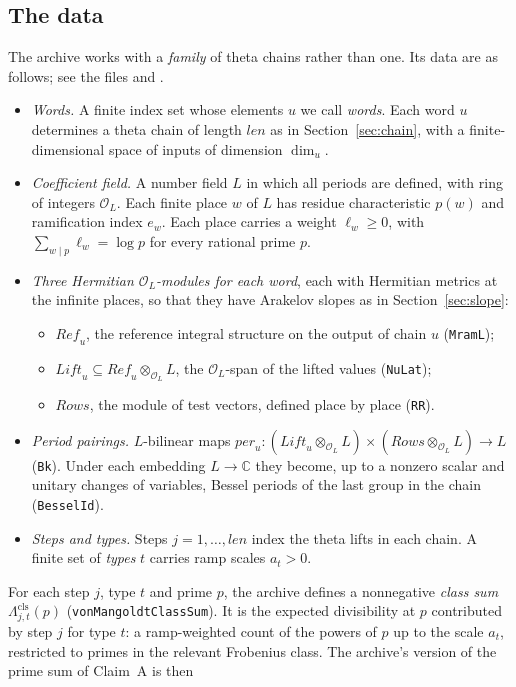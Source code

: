 \documentclass[11pt]{amsart}
\theoremstyle{definition}
\theoremstyle{remark}
\newcommand{\per}{\mathit{per}}
\newcommand{\len}{\mathit{len}}
\newcommand{\C}{\mathbb{C}}
\begin{document}
\subsection{The data}\label{subsec:assembly-data}
The archive works with a \emph{family} of theta chains rather than one. Its data are as follows; see the files  and .

\begin{itemize}
\item \emph{Words.} A finite index set whose elements $u$ we call \emph{words}. Each word $u$ determines a theta chain of length $\len$ as in Section~\ref{sec:chain}, with a finite-dimensional space of inputs of dimension $\dim_u$.
\item \emph{Coefficient field.} A number field $L$ in which all periods are defined, with ring of integers $\mathcal O_L$. Each finite place $w$ of $L$ has residue characteristic $p(w)$ and ramification index $e_w$. Each place carries a weight $\ell_w\ge0$, with $\sum_{w\mid p}\ell_w=\log p$ for every rational prime $p$.
\item \emph{Three Hermitian $\mathcal O_L$-modules for each word}, each with Hermitian metrics at the infinite places, so that they have Arakelov slopes as in Section~\ref{sec:slope}:
\begin{itemize}
\item $\mathit{Ref}_u$, the reference integral structure on the output of chain $u$ (\texttt{MramL});
\item $\mathit{Lift}_u\subseteq\mathit{Ref}_u\otimes_{\mathcal O_L}L$, the $\mathcal O_L$-span of the lifted values (\texttt{NuLat});
\item $\mathit{Rows}$, the module of test vectors, defined place by place (\texttt{RR}).
\end{itemize}
\item \emph{Period pairings.} $L$-bilinear maps $\per_u\colon(\mathit{Lift}_u\otimes_{\mathcal O_L}L)\times(\mathit{Rows}\otimes_{\mathcal O_L}L)\to L$ (\texttt{Bk}). Under each embedding $L\to\C$ they become, up to a nonzero scalar and unitary changes of variables, Bessel periods of the last group in the chain (\texttt{BesselId}).
\item \emph{Steps and types.} Steps $j=1,\dots,\len$ index the theta lifts in each chain. A finite set of \emph{types} $t$ carries ramp scales $a_t>0$.
\end{itemize}
For each step $j$, type $t$ and prime $p$, the archive defines a nonnegative \emph{class sum} $\Lambda^{\mathrm{cls}}_{j,t}(p)$ (\texttt{vonMangoldtClassSum}). It is the expected divisibility at $p$ contributed by step $j$ for type $t$: a ramp-weighted count of the powers of $p$ up to the scale $a_t$, restricted to primes in the relevant Frobenius class. The archive's version of the prime sum of Claim~A is then
\end{document}
